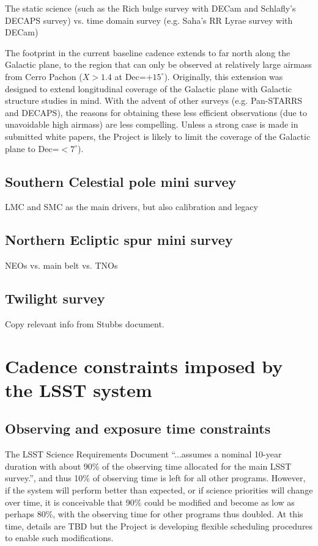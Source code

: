 \documentclass[DM,lsstdraft,toc,usenatbib]{lsstdoc}
\begin{document}
The static science (such as the Rich bulge survey with DECam and Schlafly's DECAPS survey) 
vs. time domain survey (e.g. Saha's RR Lyrae survey with DECam)  

The footprint in the current baseline cadence extends to far north along the Galactic
plane, to the region that can only be observed at relatively large airmass from Cerro Pachon 
($X>1.4$ at Dec=$+15^\circ$). Originally, this extension was designed to extend longitudinal 
coverage of the Galactic plane with Galactic structure studies in mind. With the advent of other 
surveys (e.g. Pan-STARRS and DECAPS), the reasons for obtaining these less efficient observations 
(due to unavoidable high airmass) are less compelling. Unless a strong case is made in submitted
white papers, the Project is likely to limit the coverage of the Galactic plane to  Dec=$<7^\circ$). 



\subsection{Southern Celestial pole mini survey}


LMC and SMC as the main drivers, but also calibration and legacy 


\subsection{Northern Ecliptic spur mini survey}

NEOs vs. main belt vs. TNOs 


\subsection{Twilight survey} 

Copy relevant info from Stubbs document. 



\section{Cadence constraints imposed by the LSST system} 


\subsection{Observing and exposure time constraints}

The LSST Science Requirements Document  ``...assumes a nominal 10-year duration with about 90\% 
of the observing time allocated for the main LSST survey.'', and thus 10\% of observing time is left for 
all other programs. However, if the system will perform better than expected, or if science priorities 
will change over time, it is conceivable that 90\% could be modified and become as low as perhaps 80\%, 
with the observing time for other programs thus doubled. At this time, details are TBD but the Project
is developing flexible scheduling procedures to enable such modifications. 
\end{document}
